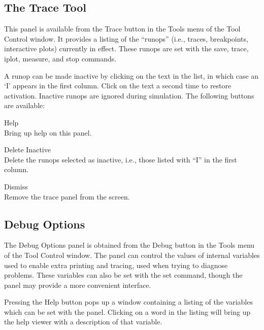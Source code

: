 \subsection{The Trace Tool}
\label{tracepanel}

This panel is available from the {\cb Trace} button in the {\cb Tools}
menu of the {\cb Tool Control} window.  It provides a listing of the
``runops'' (i.e., traces, breakpoints, interactive plots) currently in
effect.  These runops are set with the {\cb save}, {\cb trace}, {\cb
iplot}, {\cb measure}, and {\cb stop} commands.

A runop can be made inactive by clicking on the text in the list, in
which case an `I' appears in the first column.  Click on the text a
second time to restore activation.  Inactive runops are ignored during
simulation.  The following buttons are available:

\begin{description}
\item{\cb Help}\\
    Bring up help on this panel.
\item{\cb Delete Inactive}\\
    Delete the runops selected as inactive, i.e., those listed with
    ``I'' in the first column.
\item{\cb Dismiss}\\
    Remove the trace panel from the screen.
\end{description}

\subsection{Debug Options}
\label{dbgopts}

The {\cb Debug Options} panel is obtained from the {\cb Debug} button
in the {\cb Tools} menu of the {\cb Tool Control} window.  The panel
can control the values of internal variables used to enable extra
printing and tracing, used when trying to diagnose problems.  These
variables can also be set with the {\cb set} command, though the panel
may provide a more convenient interface.

Pressing the {\cb Help} button pops up a window containing a listing
of the variables which can be set with the panel.  Clicking on a word
in the listing will bring up the help viewer with a description of
that variable.


